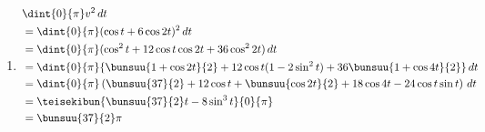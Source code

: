 \begin{enumerate}

  \item \begin{align*}
    & \dint{0}{\pi} v^2 \,dt\\
    &=\dint{0}{\pi} (\cos t + 6\cos 2t)^2 \,dt\\
    &=\dint{0}{\pi} (\cos^2t + 12\cos t\cos2t + 36\cos^22t)\,dt\\
    &=\dint{0}{\pi} \{\bunsuu{1+\cos 2t}{2} + 12\cos t(1-2\sin^2t) + 36 \bunsuu{1 + \cos 4t}{2}\}\, dt\\
    &=\dint{0}{\pi} \left(
      \bunsuu{37}{2} + 12\cos t + \bunsuu{\cos 2t}{2} + 18\cos 4t - 24\cos t \sin t
    \right)\, dt\\
    &=\teisekibun{\bunsuu{37}{2}t - 8\sin^3t}{0}{\pi}\\
    &=\bunsuu{37}{2}\pi
  \end{align*}

\end{enumerate}
